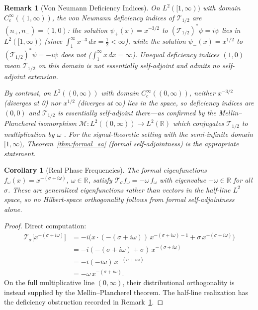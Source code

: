 \documentclass[11pt]{article}
\newtheorem{corollary}[theorem]{Corollary}
\newtheorem{remark}[theorem]{Remark}
\begin{document}
\begin{remark}[Von Neumann Deficiency Indices]
\label{rem:deficiency}
On $L^2([1,\infty))$ with domain $C_c^\infty((1,\infty))$, the von Neumann
deficiency indices of $\mathcal{T}_{1/2}$ are $(n_+, n_-) = (1,0)$: the solution
$\psi_+(x) = x^{-3/2}$ to $(\mathcal{T}_{1/2})^*\psi = i\psi$ lies in $L^2([1,\infty))$
(since $\int_1^\infty x^{-3}\,dx = \tfrac12 < \infty$), while the solution
$\psi_-(x) = x^{1/2}$ to $(\mathcal{T}_{1/2})^*\psi = -i\psi$ does not
($\int_1^\infty x\,dx = \infty$).  Unequal deficiency indices $(1,0)$ mean
$\mathcal{T}_{1/2}$ on this domain is \emph{not} essentially self-adjoint and
admits no self-adjoint extension.

By contrast, on $L^2((0,\infty))$ with domain $C_c^\infty((0,\infty))$, neither
$x^{-3/2}$ (diverges at 0) nor $x^{1/2}$ (diverges at $\infty$) lies in the space,
so deficiency indices are $(0,0)$ and $\mathcal{T}_{1/2}$ is \emph{essentially
self-adjoint} there---as confirmed by the Mellin--Plancherel isomorphism
$\mathcal{M}: L^2((0,\infty)) \to L^2(\mathbb{R})$ which conjugates
$\mathcal{T}_{1/2}$ to multiplication by $\omega$ \cite{ReedSimon1972}.
For the signal-theoretic setting with the semi-infinite domain $[1,\infty)$,
Theorem~\ref{thm:formal_sa} (formal self-adjointness) is the appropriate
statement.
\end{remark}

\begin{corollary}[Real Phase Frequencies]
\label{cor:real_eigvals}
The formal eigenfunctions $f_\omega(x) = x^{-(\sigma+i\omega)}$,
$\omega \in \mathbb{R}$, satisfy
$\mathcal{T}_\sigma f_\omega = -\omega\,f_\omega$
with eigenvalue $-\omega \in \mathbb{R}$ for all $\sigma$.
These are generalized eigenfunctions rather than vectors in the half-line
$L^2$ space, so no Hilbert-space orthogonality follows from formal
self-adjointness alone.
\end{corollary}

\begin{proof}
Direct computation:
\begin{align*}
  \mathcal{T}_\sigma\bigl[x^{-(\sigma+i\omega)}\bigr]
  &= -i\bigl(x\cdot(-(\sigma+i\omega))\,x^{-(\sigma+i\omega)-1}
     + \sigma\,x^{-(\sigma+i\omega)}\bigr) \\
  &= -i(-(\sigma+i\omega)+\sigma)\,x^{-(\sigma+i\omega)}\\
  &= -i(-i\omega)\,x^{-(\sigma+i\omega)}\\
  &= -\omega\,x^{-(\sigma+i\omega)}.
\end{align*}
On the full multiplicative line $(0,\infty)$, their distributional
orthogonality is instead supplied by the Mellin--Plancherel theorem.  The
half-line realization has the deficiency obstruction recorded in
Remark~\ref{rem:deficiency}.
\end{proof}
\end{document}
